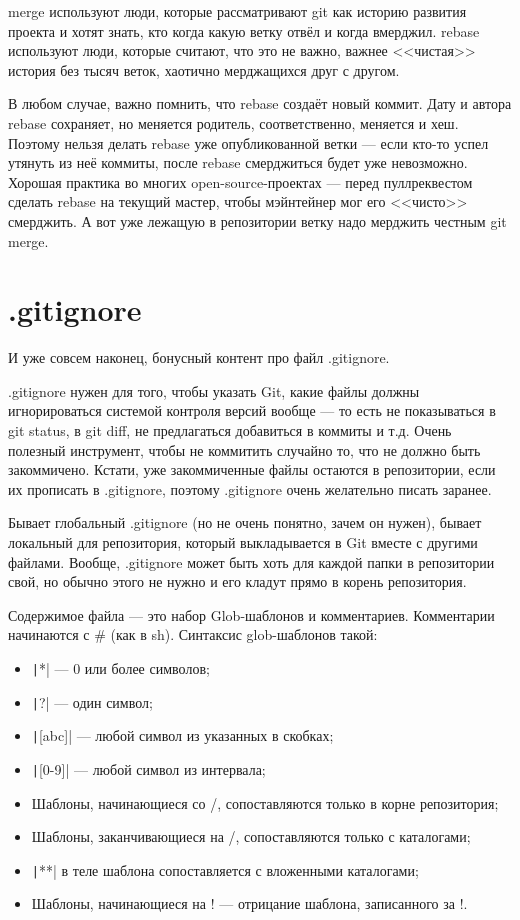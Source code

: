 \documentclass{../text-style}
\begin{document}
merge используют люди, которые рассматривают git как историю развития проекта и хотят знать, кто когда какую ветку отвёл и когда вмерджил. rebase используют люди, которые считают, что это не важно, важнее <<чистая>> история без тысяч веток, хаотично мерджащихся друг с другом.

В любом случае, важно помнить, что rebase создаёт новый коммит. Дату и автора rebase сохраняет, но меняется родитель, соответственно, меняется и хеш. Поэтому нельзя делать rebase уже опубликованной ветки --- если кто-то успел утянуть из неё коммиты, после rebase смерджиться будет уже невозможно. Хорошая практика во многих open-source-проектах --- перед пуллреквестом сделать rebase на текущий мастер, чтобы мэйнтейнер мог его <<чисто>> смерджить. А вот уже лежащую в репозитории ветку надо мерджить честным git merge.

\section{.gitignore}

И уже совсем наконец, бонусный контент про файл .gitignore.

.gitignore нужен для того, чтобы указать Git, какие файлы должны игнорироваться системой контроля версий вообще --- то есть не показываться в git status, в git diff, не предлагаться добавиться в коммиты и т.д. Очень полезный инструмент, чтобы не коммитить случайно то, что не должно быть закоммичено. Кстати, уже закоммиченные файлы остаются в репозитории, если их прописать в .gitignore, поэтому .gitignore очень желательно писать заранее. 

Бывает глобальный .gitignore (но не очень понятно, зачем он нужен), бывает локальный для репозитория, который выкладывается в Git вместе с другими файлами. Вообще, .gitignore может быть хоть для каждой папки в репозитории свой, но обычно этого не нужно и его кладут прямо в корень репозитория.

Содержимое файла --- это набор Glob-шаблонов и комментариев. Комментарии начинаются с \# (как в sh). Синтаксис glob-шаблонов такой:

\begin{itemize}
    \item \texttt|*| --- 0 или более символов;
    \item \texttt|?| --- один символ;
    \item \texttt|[abc]| --- любой символ из указанных в скобках;
    \item \texttt|[0-9]| --- любой символ из интервала;
    \item Шаблоны, начинающиеся со /, сопоставляются только в корне репозитория;
    \item Шаблоны, заканчивающиеся на /, сопоставляются только с каталогами;
    \item \texttt|**| в теле шаблона сопоставляется с вложенными каталогами;
    \item Шаблоны, начинающиеся на ! --- отрицание шаблона, записанного за !.
\end{itemize}
\end{document}
